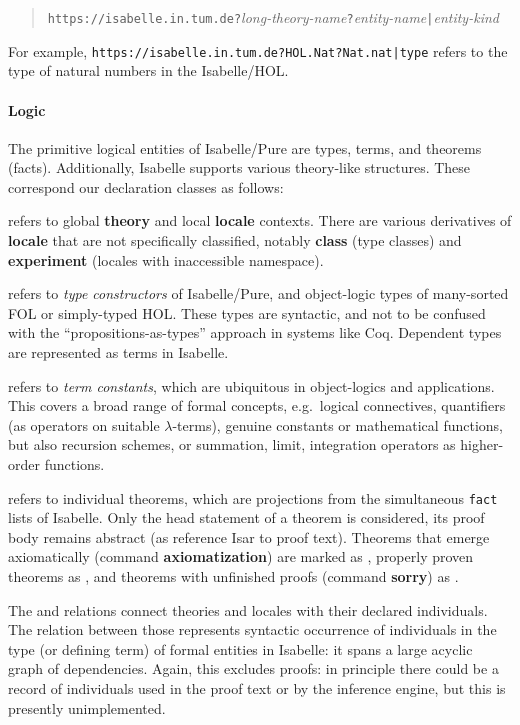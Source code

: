 \begin{quote}
\texttt{https://isabelle.in.tum.de?}\emph{long-theory-name}\texttt{?}\emph{entity-name}\texttt{|}\emph{entity-kind}
\end{quote}

\noindent For example, \texttt{https://isabelle.in.tum.de?HOL.Nat?Nat.nat|type} refers to the type of natural numbers in the Isabelle/HOL.

\paragraph{Logic}
The primitive logical entities of Isabelle/Pure are types, terms, and theorems (facts).
Additionally, Isabelle supports various theory-like structures.
These correspond our declaration classes as follows:
\begin{compactitem}
\item {} refers to global \textbf{theory} and local \textbf{locale} contexts. There are various derivatives of \textbf{locale} that are not specifically classified, notably \textbf{class} (type classes) and \textbf{experiment} (locales with inaccessible namespace).
\item {} refers to \emph{type constructors} of Isabelle/Pure, and object-logic types of many-sorted FOL or simply-typed HOL. These types are syntactic, and not to be confused with the ``propositions-as-types'' approach in systems like Coq. Dependent types are represented as terms in Isabelle.
\item {} refers to \emph{term constants}, which are ubiquitous in object-logics and applications. This covers a broad range of formal concepts, e.g.\ logical connectives, quantifiers (as operators on suitable $\lambda$-terms), genuine constants or mathematical functions, but also recursion schemes, or summation, limit, integration operators as higher-order functions.
\item {} refers to individual theorems, which are projections from the simultaneous \texttt{fact} lists of Isabelle.  Only the head statement of a theorem is considered, its proof body remains abstract (as reference Isar to proof text).
Theorems that emerge axiomatically (command \textbf{axiomatization}) are marked as , properly proven theorems as , and theorems with unfinished proofs (command \textbf{sorry}) as .
\end{compactitem}

\noindent The  and  relations connect theories and locales with their declared individuals.
The  relation between those represents syntactic occurrence of individuals in the type (or defining term) of formal entities in Isabelle: it spans a large acyclic graph of dependencies. Again, this excludes proofs: in principle there could be a record of individuals used in the proof text or by the inference engine, but this is presently unimplemented.

